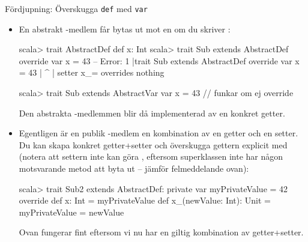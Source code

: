 \begin{Slide}{Fördjupning: Överskugga \texttt{def} med \texttt{var}}\SlideFontTiny
\begin{itemize}
\item En abstrakt -medlem får bytas ut mot en  om du  skriver :
\begin{REPLsmall}
scala> trait AbstractDef { def x: Int }
scala> trait Sub extends AbstractDef { override var x = 43 }
-- Error:
1 |trait Sub extends AbstractDef { override var x = 43 }
  |                                             ^
  |                                             setter x_= overrides nothing

scala> trait Sub extends AbstractVar { var x = 43 }   // funkar om ej override
\end{REPLsmall}
Den abstrakta -medlemmen blir då implementerad av en konkret getter. 
\item Egentligen är en publik -medlem en kombination av en getter och en setter. Du kan skapa konkret getter+setter och överskugga gettern explicit med  (notera att settern inte kan göra , eftersom superklassen inte har någon motsvarande metod att byta ut -- jämför felmeddelande ovan):
\begin{REPLsmall}
scala> trait Sub2 extends AbstractDef:
         private var myPrivateValue = 42
         override def x: Int = myPrivateValue
         def x_(newValue: Int): Unit = myPrivateValue = newValue
\end{REPLsmall}
Ovan fungerar fint eftersom vi nu har en giltig kombination av getter+setter.
\end{itemize}
\end{Slide}



